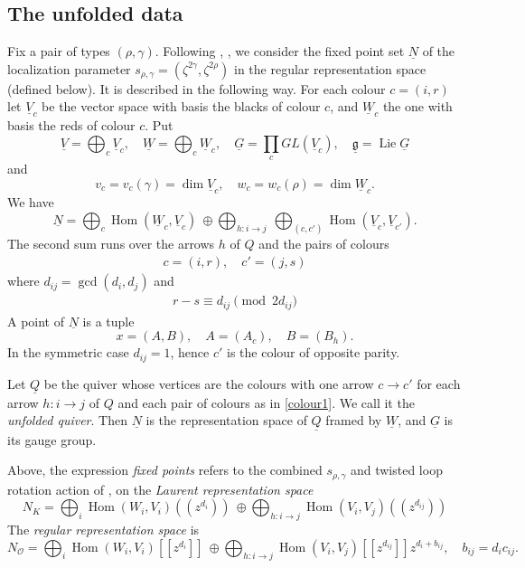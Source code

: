 \documentclass[11pt,reqno]{amsart}
\theoremstyle{definition}
\theoremstyle{remark}
\def\dN{\underline N}
\def\dG{\underline G}
\def\dV{\underline V}
\def\dW{\underline W}
\def\dQ{\underline Q}
\def\dg{\underline{\mathfrak g}}
\providecommand{\calO}{\mathcal O}
\def\Hom{\operatorname{Hom}}
\newcommand{\llb}{[\![}
\newcommand{\rrb}{]\!]}
\newcommand{\llp}{(\!(}
\newcommand{\rrp}{)\!)}
\begin{document}
\subsection{The unfolded data}\label{subsec:unfolded}
Fix a pair of types $(\rho,\gamma)$. 
Following \cite{VV25}, \cite{VVsh}, we consider
the fixed point set $\dN$ of the localization parameter $s_{\rho,\gamma}=(\zeta^{2\gamma},\zeta^{2\rho})$
in the regular representation space (defined below).
It is described in the following way.
For each colour $c=(i,r)$ let $\dV_c$ be the vector space with basis
the blacks of colour $c$, and $\dW_c$ the one with basis the reds of colour $c$. Put 
$$\dV=\bigoplus_c\dV_c,\quad
\dW=\bigoplus_c\dW_c,\quad
\dG=\prod_cGL(\dV_c),\quad
\dg=\operatorname{Lie}\dG$$
and
$$v_c=v_c(\gamma)=\dim \dV_c,\quad w_c=w_c(\rho)=\dim\dW_c.$$
We have
\[
\dN=\bigoplus_c\Hom(\dW_c,\dV_c)\ \oplus\bigoplus_{h:i\to j}\ \bigoplus_{(c,c')}\Hom(\dV_c,\dV_{c'}).
\]
The second sum runs over the arrows $h$ of $Q$ and the pairs of colours 
\begin{align}\label{colour1}c=(i,r),\quad c'=(j,s)\end{align} 
where $d_{ij}=\gcd(d_i,d_j)$ and
\begin{align}\label{parity}
r-s\equiv d_{ij}\pmod{2d_{ij}}
\end{align}
A point of $\dN$ is a tuple
$$x=(A,B),\quad
A=(A_c),\quad
B=(B_h).$$ 
In the symmetric case $d_{ij}=1$, hence $c'$ is the colour of opposite parity.

Let $\dQ$ be the quiver whose vertices are the colours with one arrow
$c\to c'$ for each arrow $h:i\to j$ of $Q$ and each pair of colours as in \eqref{colour1}.
We call it the \emph{unfolded quiver}. 
Then $\dN$ is the representation space of $\dQ$ framed by $\dW$, and
$\dG$ is its gauge group.

Above, the expression \emph{fixed points} refers to the combined $s_{\rho,\gamma}$ and twisted loop
rotation action of \cite{VV25}, \cite{VVsh} on the \emph{Laurent representation space} 
$$N_K=\bigoplus_i\Hom(W_i,V_i)\llp z^{d_i}\rrp
 \ \oplus\!\bigoplus_{h:i\to j}
 \Hom(V_i,V_j)\llp z^{d_{ij}}\rrp$$
The \emph{regular representation space} is
\[
 N_\calO=\bigoplus_i\Hom(W_i,V_i)\llb z^{d_i}\rrb
 \ \oplus\!\bigoplus_{h:i\to j}
 \Hom(V_i,V_j)\llb z^{d_{ij}}\rrb z^{d_i+b_{ij}},
 \quad b_{ij}=d_ic_{ij}.
\]
\end{document}
